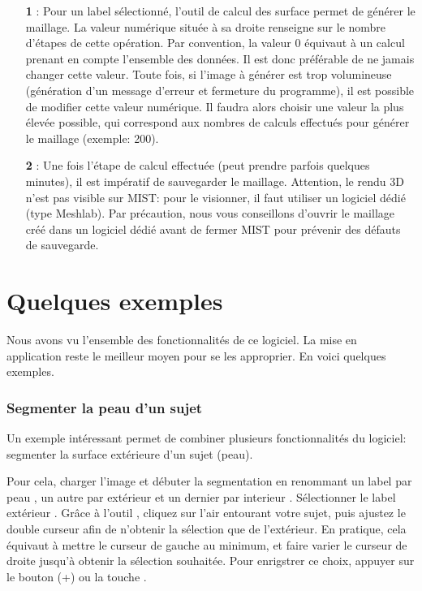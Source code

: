 \documentclass {article}
\begin{document}
\begin{itemize}
	\item[\textbf{1}]: Pour un label sélectionné, l'outil de calcul des surface permet de générer le maillage. La valeur numérique située à sa droite renseigne sur le nombre d'étapes de cette opération. Par convention, la valeur 0 équivaut à un calcul prenant en compte l'ensemble des données. Il est donc préférable de ne jamais changer cette valeur. Toute fois, si l'image à générer est trop volumineuse (génération d'un message d'erreur et fermeture du programme), il est possible de modifier cette valeur numérique. Il faudra alors choisir une valeur la plus élevée possible, qui correspond aux nombres de calculs effectués pour générer le maillage (exemple: 200).
	\item[\textbf{2}]: Une fois l'étape de calcul effectuée (peut prendre parfois quelques minutes), il est impératif de sauvegarder le maillage. Attention, le rendu 3D n'est pas visible sur MIST: pour le visionner, il faut utiliser un logiciel dédié (type Meshlab). Par précaution, nous vous conseillons d'ouvrir le maillage créé dans un logiciel dédié avant de fermer MIST pour prévenir des défauts de sauvegarde.

	
\end{itemize}

\part{Quelques exemples}

Nous avons vu l'ensemble des fonctionnalités de ce logiciel. La mise en application reste le meilleur moyen pour se les approprier. En voici quelques exemples.

\section{Segmenter la peau d'un sujet}

Un exemple intéressant permet de combiner plusieurs fonctionnalités du logiciel: segmenter la surface extérieure d'un sujet (peau).

Pour cela, charger l'image et débuter la segmentation en renommant un label par \og peau \fg , un autre par \og extérieur \fg et un dernier par \og interieur \fg . Sélectionner le label \og extérieur \fg . Grâce à l'outil , cliquez sur l'air entourant votre sujet, puis ajustez le double curseur afin de n'obtenir la sélection que de l'extérieur. En pratique, cela équivaut à mettre le curseur de gauche au minimum, et faire varier le curseur de droite jusqu'à obtenir la sélection souhaitée. Pour enrigstrer ce choix, appuyer sur le bouton (+) ou la touche .
\end{document}
